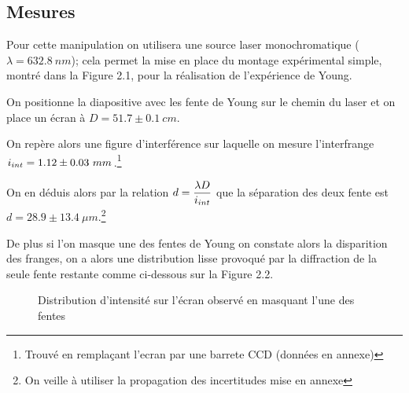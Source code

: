 \documentclass[11pt, openright]{book}
\begin{document}
				\subsection{Mesures}

				Pour cette manipulation  on utilisera une source laser monochromatique ($\lambda =632.8\ nm$); cela permet la mise en place du montage expérimental simple, montré dans la Figure 2.1, pour la réalisation de l'expérience de Young.

				On positionne la diapositive avec les fente de Young sur le chemin du laser et on place un écran à $D=51.7\pm 0.1\ cm$. 

				On repère alors une figure d'interférence sur laquelle on mesure l'interfrange $\displaystyle{i_{int} = 1.12 \pm 0.03\  mm}$.\footnote{Trouvé en remplaçant l'ecran par une barrete CCD (données en annexe)} 


				On en déduis alors par la relation $\displaystyle{d=\frac{\lambda  D}{i_{int}}}$ que la séparation des deux fente est $d=28.9\pm 13.4\ \mu m$.\footnote{On veille à utiliser la propagation des incertitudes mise en annexe}

				De plus si l'on masque une des fentes de Young on constate alors la disparition des franges, on a alors une distribution lisse provoqué par la diffraction de la seule fente restante comme ci-dessous sur la Figure 2.2.

				\begin{figure}[ht!]
					\centering
					\caption{Distribution d'intensité sur l'écran observé en masquant l'une des fentes}
				\end{figure}
\end{document}
